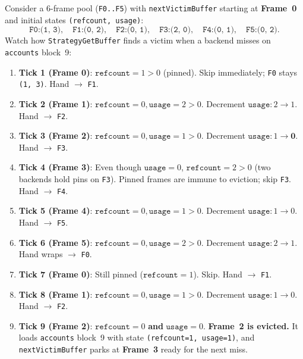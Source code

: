 \begin{example}
\label{ex:ch02-clock-trace}
Consider a 6-frame pool (\texttt{F0..F5}) with \texttt{nextVictimBuffer} starting at \textbf{Frame~0} and initial states \texttt{(refcount, usage)}:
\[
  \texttt{F0:(1, 3)}, \quad \texttt{F1:(0, 2)}, \quad \texttt{F2:(0, 1)}, \quad \texttt{F3:(2, 0)}, \quad \texttt{F4:(0, 1)}, \quad \texttt{F5:(0, 2)}.
\]
Watch how \texttt{StrategyGetBuffer} finds a victim when a backend misses on \texttt{accounts} block~9:
\begin{enumerate}
  \item \textbf{Tick 1 (Frame 0)}: $\texttt{refcount} = 1 > 0$ (pinned). Skip immediately; \texttt{F0} stays \texttt{(1, 3)}. Hand $\to$ \texttt{F1}.
  \item \textbf{Tick 2 (Frame 1)}: $\texttt{refcount} = 0, \texttt{usage} = 2 > 0$. Decrement $\texttt{usage}: 2 \to 1$. Hand $\to$ \texttt{F2}.
  \item \textbf{Tick 3 (Frame 2)}: $\texttt{refcount} = 0, \texttt{usage} = 1 > 0$. Decrement $\texttt{usage}: 1 \to \mathbf{0}$. Hand $\to$ \texttt{F3}.
  \item \textbf{Tick 4 (Frame 3)}: Even though $\texttt{usage} = 0$, $\texttt{refcount} = 2 > 0$ (two backends hold pins on \texttt{F3}). Pinned frames are immune to eviction; skip \texttt{F3}. Hand $\to$ \texttt{F4}.
  \item \textbf{Tick 5 (Frame 4)}: $\texttt{refcount} = 0, \texttt{usage} = 1 > 0$. Decrement $\texttt{usage}: 1 \to 0$. Hand $\to$ \texttt{F5}.
  \item \textbf{Tick 6 (Frame 5)}: $\texttt{refcount} = 0, \texttt{usage} = 2 > 0$. Decrement $\texttt{usage}: 2 \to 1$. Hand wraps $\to$ \texttt{F0}.
  \item \textbf{Tick 7 (Frame 0)}: Still pinned ($\texttt{refcount} = 1$). Skip. Hand $\to$ \texttt{F1}.
  \item \textbf{Tick 8 (Frame 1)}: $\texttt{refcount} = 0, \texttt{usage} = 1 > 0$. Decrement $\texttt{usage}: 1 \to 0$. Hand $\to$ \texttt{F2}.
  \item \textbf{Tick 9 (Frame 2)}: $\texttt{refcount} = 0$ \textbf{and} $\texttt{usage} = 0$. \textbf{Frame~2 is evicted.} It loads \texttt{accounts} block~9 with state \texttt{(refcount=1, usage=1)}, and \texttt{nextVictimBuffer} parks at \textbf{Frame~3} ready for the next miss.
\end{enumerate}
\end{example}

